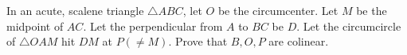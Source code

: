 In an acute, scalene triangle $\triangle ABC$, let $O$ be the circumcenter. Let $M$ be the midpoint of $AC$.
Let the perpendicular from $A$ to $BC$ be $D$. Let the circumcircle of $\triangle OAM$ hit $DM$ at $P(\not= M)$.
Prove that $B, O, P$ are colinear.
